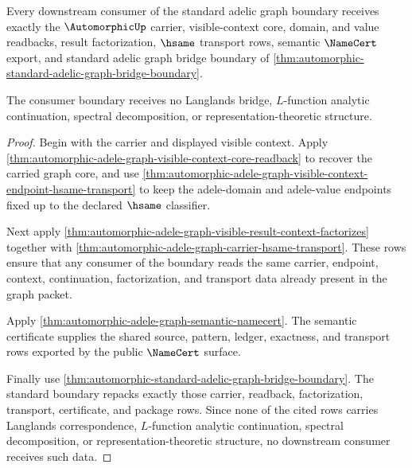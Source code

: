 \begin{theorem}
\label{thm:automorphic-mature-consumer-coverage}
Every downstream consumer of the standard adelic graph boundary receives
exactly the $\AutomorphicUp$ carrier, visible-context core, domain, and value
readbacks, result factorization, $\hsame$ transport rows, semantic
$\NameCert$ export, and standard adelic graph bridge boundary of
\autoref{thm:automorphic-standard-adelic-graph-bridge-boundary}.

The consumer boundary receives no Langlands bridge, $L$-function analytic
continuation, spectral decomposition, or representation-theoretic structure.
\end{theorem}
\begin{proof}
Begin with the carrier and displayed visible context. Apply
\autoref{thm:automorphic-adele-graph-visible-context-core-readback} to recover
the carried graph core, and use
\autoref{thm:automorphic-adele-graph-visible-context-endpoint-hsame-transport}
to keep the adele-domain and adele-value endpoints fixed up to the declared
$\hsame$ classifier.

Next apply
\autoref{thm:automorphic-adele-graph-visible-result-context-factorizes}
together with
\autoref{thm:automorphic-adele-graph-carrier-hsame-transport}. These rows
ensure that any consumer of the boundary reads the same carrier, endpoint,
context, continuation, factorization, and transport data already present in the
graph packet.

Apply \autoref{thm:automorphic-adele-graph-semantic-namecert}. The semantic
certificate supplies the shared source, pattern, ledger, exactness, and
transport rows exported by the public $\NameCert$ surface.

Finally use
\autoref{thm:automorphic-standard-adelic-graph-bridge-boundary}. The standard
boundary repacks exactly those carrier, readback, factorization, transport,
certificate, and package rows. Since none of the cited rows carries Langlands
correspondence, $L$-function analytic continuation, spectral decomposition, or
representation-theoretic structure, no downstream consumer receives such data.
\end{proof}

